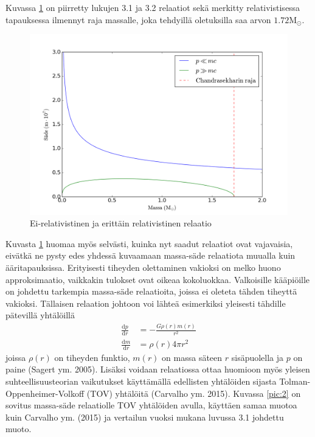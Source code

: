 \documentclass[12pt,a4paper,titlepage]{article}
\begin{document}
Kuvassa \ref{pic:1} on piirretty lukujen 3.1 ja 3.2 relaatiot sekä merkitty relativistisessa tapauksessa ilmennyt raja massalle, joka tehdyillä oletuksilla saa arvon $1.72 \mathrm{M}_{\odot}$.
\begin{figure}[H]
\centering
\includegraphics[width=\textwidth]{mr1.png}
\caption{Ei-relativistinen ja erittäin relativistinen relaatio}
\label{pic:1}
\end{figure}
Kuvasta \ref{pic:1} huomaa myös selvästi, kuinka nyt saadut relaatiot ovat vajavaisia, eivätkä ne pysty edes yhdessä kuvaamaan massa-säde relaatiota muualla kuin ääritapauksissa. Erityisesti tiheyden olettaminen vakioksi on melko huono approksimaatio, vaikkakin tulokset ovat oikeaa kokoluokkaa.
\newpage
Valkoisille kääpiöille on johdettu tarkempia massa-säde relaatioita, joissa ei oleteta tähden tiheyttä vakioksi. Tällaisen relaation johtoon voi lähteä esimerkiksi yleisesti tähdille pätevillä yhtälöillä
\begin{align}
\frac{\mathrm{d}p}{\mathrm{d}r} &= - \frac{G \rho(r) m(r)}{r^2} \\
\frac{\mathrm{d}m}{\mathrm{d}r} &= \rho(r) 4 \pi r^2
\end{align}
joissa $\rho(r)$ on tiheyden funktio, $m(r)$ on massa säteen $r$ sisäpuolella ja $p$ on paine (Sagert ym. 2005). Lisäksi voidaan relaatiossa ottaa huomioon myös yleisen suhteellisuusteorian vaikutukset käyttämällä edellisten yhtälöiden sijasta Tolman-Oppenheimer-Volkoff (TOV) yhtälöitä (Carvalho ym. 2015). Kuvassa \ref{pic:2} on sovitus massa-säde relaatiolle TOV yhtälöiden avulla, käyttäen samaa muotoa kuin Carvalho ym. (2015) ja vertailun vuoksi mukana luvussa 3.1 johdettu muoto.
\end{document}
